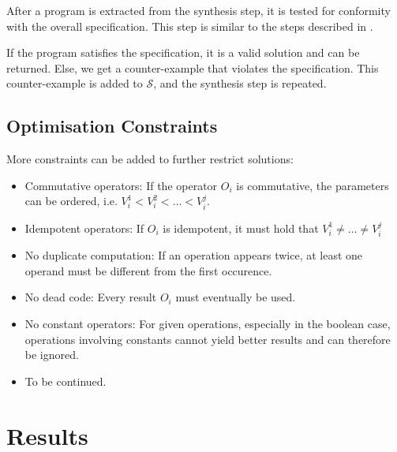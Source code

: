 \documentclass[a4paper]{article}
\renewcommand{\S}{\mathcal{S}}
\begin{document}
After a program is extracted from the synthesis step, it is tested for conformity with the overall specification. This step is similar to the steps described in \cite{DBLP:conf/pldi/GulwaniJTV110}.

If the program satisfies the specification, it is a valid solution and can be returned. Else, we get a counter-example that violates the specification. This counter-example is added to $\S$, and the synthesis step is repeated.

\subsection{Optimisation Constraints}
More constraints can be added to further restrict solutions:
\begin{itemize}
  \item Commutative operators: If the operator $O_i$ is commutative, the parameters can be ordered, i.e. $V_i^1 < V_i^2 < \dots < V_i^j$.
  \item Idempotent operators: If $O_i$ is idempotent, it must hold that $V_i^1 \not= \dots \not= V_i^j$
  \item No duplicate computation: If an operation appears twice, at least one operand must be different from the first occurence.
  \item No dead code: Every result $O_i$ must eventually be used.
  \item No constant operators: For given operations, especially in the boolean case, operations involving constants cannot yield better results and can therefore be ignored.
  \item To be continued.
\end{itemize}

\section{Results}
\end{document}
